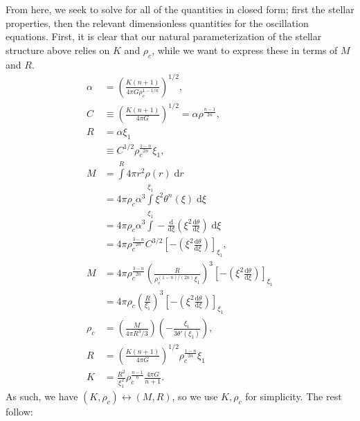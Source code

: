 \documentclass[11pt,
        usenames, %
        twocolumn,
        landscape,
        dvipsnames %
    ]{article}
\newcommand*{\rd}[2]{\frac{\mathrm{d}#1}{\mathrm{d}#2}}
\newcommand*{\p}[1]{\left(#1\right)}
\newcommand*{\s}[1]{\left[#1\right]}
\begin{document}
From here, we seek to solve for all of the quantities in closed form; first the
stellar properties, then the relevant dimensionless quantities for the
oscillation equations. First, it is clear that our natural parameterization of
the stellar structure above relies on $K$ and $\rho_c$, while we want to express
these in terms of $M$ and $R$.
\begin{align}
    \alpha &= \p{\frac{K\p{n + 1}}{4\pi G \rho_c^{1 - 1/n}}}^{1/2},\\
    C &\equiv \p{\frac{K\p{n + 1}}{4\pi G}}^{1/2}
        = \alpha \rho^{\frac{n - 1}{2n}},\\
    R &= \alpha \xi_1\nonumber\\
        &\equiv C^{1/2}\rho_c^{\frac{1 - n}{2n}} \xi_1,\\
    M &= \int\limits^R 4\pi r^2 \rho(r)\;\mathrm{d}r\nonumber\\
        &= 4\pi \rho_c \alpha^3 \int\limits^{\xi_1} \xi^2
            \theta^n(\xi)\;\mathrm{d}\xi\nonumber\\
        &= 4\pi \rho_c \alpha^3 \int\limits^{\xi_1}
            -\rd{}{\xi}\p{\xi^2\rd{\theta}{\xi}}\;\mathrm{d}\xi\nonumber\\
        &= 4\pi \rho_c^{\frac{3 - n}{2n}} C^{3/2}
            \s{-\p{\xi^2\rd{\theta}{\xi}}}_{\xi_1},\\
    M &= 4\pi \rho_c^{\frac{3 - n}{2n}}
            \p{\frac{R}{\rho_c^{(1 - n) / (2n)}\xi_1}}^3
            \s{-\p{\xi^2\rd{\theta}{\xi}}}_{\xi_1}\nonumber\\
        &= 4\pi \rho_c \p{\frac{R}{\xi_1}}^3
            \s{-\p{\xi^2\rd{\theta}{\xi}}}_{\xi_1}\nonumber\\
    \rho_c &= \p{\frac{M}{4\pi R^3/3}}
        \p{-\frac{\xi_1}{3\theta'(\xi_1)}},\\
    R &= \p{\frac{K\p{n + 1}}{4\pi G}}^{1/2}
            \rho_c^{\frac{1 - n}{2n}}\xi_1\nonumber\\
    K &= \frac{R^2}{\xi_1^2}\rho_c^{\frac{n - 1}{n}}\frac{4\pi G}{n + 1}.
\end{align}
As such, we have $\p{K, \rho_c}\leftrightarrow \p{M, R}$, so we use $K, \rho_c$
for simplicity. The rest follow:
\end{document}
